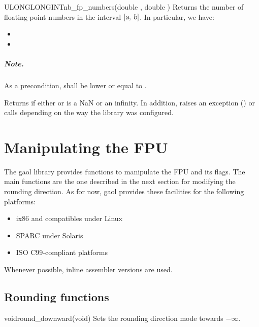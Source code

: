 \documentclass{manual}
\newcommand{\itv}[2]{\ensuremath{[#1,\,#2]}}
\begin{document}
\begin{deffun}{ULONGLONGINT}{nb\_fp\_numbers}{(double , double )}
Returns the number of floating-point numbers in the interval
\itv{\var{a}}{\var{b}}. In particular, we have:
\begin{itemize}
\item {}
\item {}
\end{itemize}

\paragraph{Note.} As a precondition,  shall be lower or equal to .

Returns  if either
 or  is a NaN or an infinity. In addition, raises
an  exception () or calls
 depending on the way the library was configured.
\end{deffun}

\chapter{Manipulating the FPU}

The gaol library provides functions to manipulate the FPU and its
flags. The main functions are the one described in the next section
for modifying the rounding direction.  As for now, gaol provides these
facilities for the following platforms:

\begin{itemize}
\item ix86 and compatibles under Linux
\item SPARC under Solaris
\item ISO C99-compliant platforms
\end{itemize}

Whenever possible, inline assembler versions are used.

\section{Rounding functions}

\begin{deffun}{void}{round\_downward}{(void)}
Sets the rounding direction mode towards $-\infty$.
\end{deffun}
\end{document}

